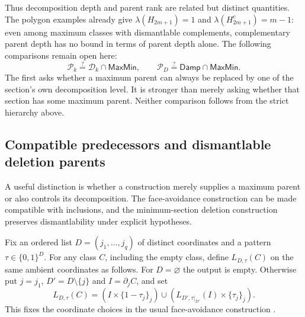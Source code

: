 \documentclass[11pt]{article}
\theoremstyle{definition}
\newcommand{\bits}{\{0,1\}}
\newcommand{\MaxMin}{\mathsf{MaxMin}}
\newcommand{\Damp}{\mathsf{Damp}}
\begin{document}
Thus decomposition depth and parent rank are related but distinct quantities.
The polygon examples already give $\lambda(H_{2m+1})=1$ and
$\lambda(H_{2m+1}^c)=m-1$: even among maximum classes with dismantlable
complements, complementary parent depth has no bound in terms of parent
depth alone. The following comparisons remain open here:
\[
 \mathcal P_k\stackrel{?}{=}\mathcal D_k\cap\MaxMin,
 \qquad \mathcal P_D\stackrel{?}{=}\Damp\cap\MaxMin.
\]
The first asks whether a maximum parent can always be replaced by one
of the section's own decomposition level. It is stronger than merely
asking whether that section has some maximum parent. Neither comparison
follows from the strict hierarchy above.

\subsection{Compatible predecessors and dismantlable deletion parents}
\label{sec:compatible-deletion-parents}

A useful distinction is whether a construction merely supplies a maximum
parent or also controls its decomposition. The face-avoidance construction
can be made compatible with inclusions, and the minimum-section deletion
construction preserves dismantlability under explicit hypotheses.

Fix an ordered list $D=(j_1,\ldots,j_q)$ of distinct coordinates and a
pattern $\tau\in\bits^D$. For any class $C$, including the empty class,
define $L_{D,\tau}(C)$ on the same ambient coordinates as follows.
For $D=\varnothing$ the output is empty. Otherwise put
$j=j_1$, $D'=D\setminus\{j\}$ and $I=\partial_jC$, and set
\[
 L_{D,\tau}(C)=
 (I\times\{1-\tau_j\}_j)\cup
 (L_{D',\tau|_{D'}}(I)\times\{\tau_j\}_j).
\]
This fixes the coordinate choices in the usual face-avoidance construction
\cite[Theorem~\textnormal{Face avoidance}]{MaxParents}.
\end{document}
